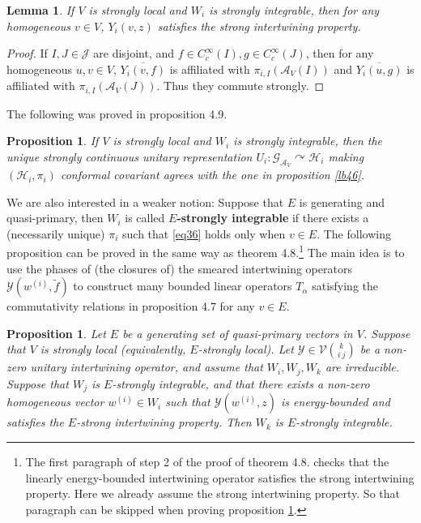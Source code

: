 \documentclass[12pt,a4paper]{article}
\theoremstyle{definition}
\theoremstyle{plain}
\newtheorem{pp}[df]{Proposition}
\newtheorem{lm}[df]{Lemma}
\newcommand{\mc}{\mathcal}
\newcommand{\wtd}{\widetilde}
\newcommand{\ovl}{\overline}
\newcommand{\GAV}{\mathscr G_{\mathcal A_V}}
\numberwithin{equation}{subsection}
\begin{document}
\begin{lm}\label{lb61}
If $V$ is strongly local and $W_i$ is strongly integrable, then for any homogeneous $v\in V$, $Y_i(v,z)$ satisfies the strong intertwining property.
\end{lm}

\begin{proof}
If $I,J\in\mc J$ are disjoint, and $f\in C_c^\infty(I),g\in C_c^\infty(J)$, then for any homogeneous $u,v\in V$, $\ovl{Y_i(v,f)}$ is affiliated with $\pi_{i,I}(\mc A_V(I))$ and $\ovl{Y_i(u,g)}$ is affiliated with $\pi_{i,I}(\mc A_V(J))$. Thus they commute strongly.
\end{proof}

The following was proved in \cite{Gui21a} proposition 4.9.

\begin{pp}
If $V$ is strongly local and $W_i$ is strongly integrable, then the unique strongly continuous unitary representation $U_i:\GAV\curvearrowright\mc H_i$ making $(\mc H_i,\pi_i)$ conformal covariant agrees with the one in proposition \ref{lb46}.
\end{pp}


We are also interested in a weaker notion: Suppose that $E$ is generating and quasi-primary, then $W_i$ is called \textbf{$E$-strongly integrable} if there exists a (necessarily unique) $\pi_i$ such that \eqref{eq36} holds only when $v\in E$. The following proposition can be proved in the same way as \cite{Gui19b} theorem 4.8.\footnote{The first paragraph of step 2 of the proof of \cite{Gui19b} theorem 4.8. checks that the linearly energy-bounded intertwining operator satisfies the strong intertwining property. Here we already assume the strong intertwining property. So that paragraph can be skipped when proving proposition \ref{lb42}.} The main idea is to use the phases of (the closures of) the smeared intertwining operators $\mc Y(w^{(i)},\wtd f)$ to construct many bounded linear operators $T_\alpha$ satisfying the commutativity relations in \cite{Gui19b} proposition 4.7 for any $v\in E$. 

\begin{pp}\label{lb42}
Let $E$ be a generating set of quasi-primary vectors in $V$. Suppose that $V$ is strongly local (equivalently, $E$-strongly local). Let $\mc Y\in\mc V{k\choose i~j}$ be a non-zero unitary intertwining operator, and assume that $W_i,W_j,W_k$ are irreducible. Suppose that $W_j$ is $E$-strongly integrable, and that there exists a non-zero homogeneous vector $w^{(i)}\in W_i$ such that $\mc Y(w^{(i)},z)$ is energy-bounded and satisfies the $E$-strong intertwining property. Then $W_k$ is $E$-strongly integrable.
\end{pp}
\end{document}

